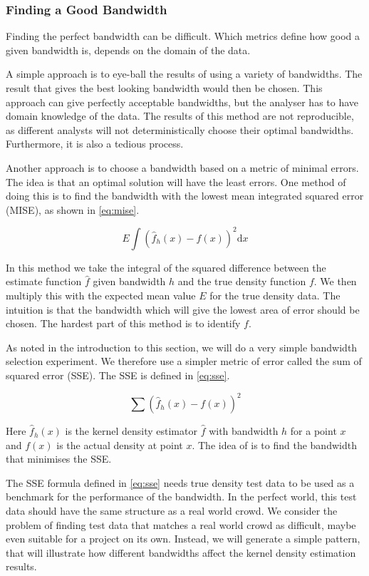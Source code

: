 \subsubsection{Finding a Good Bandwidth}

Finding the perfect bandwidth can be difficult. Which metrics define how good a given bandwidth is, depends on the domain of the data.

A simple approach is to eye-ball the results of using a variety of bandwidths. The result that gives the best looking bandwidth would then be chosen. This approach can give perfectly acceptable bandwidths, but the analyser has to have domain knowledge of the data. The results of this method are not reproducible, as different analysts will not deterministically choose their optimal bandwidths. Furthermore, it is also a tedious process.

Another approach is to choose a bandwidth based on a metric of minimal errors. The idea is that an optimal solution will have the least errors. One method of doing this is to find the bandwidth with the lowest mean integrated squared error (MISE), as shown in \cref{eq:mise}.

\begin{equation}\label{eq:mise}
     E \int(\hat f_{h}(x) - f(x) )^2\mathrm{d}x
\end{equation}

In this method we take the integral of the squared difference between the estimate function $\hat f$ given bandwidth $h$ and the true density function $f$. We then multiply this with the expected mean value $E$ for the true density data. The intuition is that the bandwidth which will give the lowest area of error should be chosen. The hardest part of this method is to identify $f$.

As noted in the introduction to this section, we will do a very simple bandwidth selection experiment. We therefore use a simpler metric of error called the sum of squared error (SSE). The SSE is defined in \cref{eq:sse}.

\begin{equation}\label{eq:sse}
    \sum (\hat f_{h}(x) - f(x) )^2
\end{equation}

Here $\hat f_{h}(x)$ is the kernel density estimator $\hat f$ with bandwidth $h$ for a point $x$  and $f(x)$ is the actual density at point $x$. The idea of is to find the bandwidth that minimises the SSE.

The SSE formula defined in \cref{eq:sse} needs true density test data to be used as a benchmark for the performance of the bandwidth. In the perfect world, this test data should have the same structure as a real world crowd. We consider the problem of finding test data that matches a real world crowd as difficult, maybe even suitable for a project on its own. Instead, we will generate a simple pattern, that will illustrate how different bandwidths affect the kernel density estimation results.

